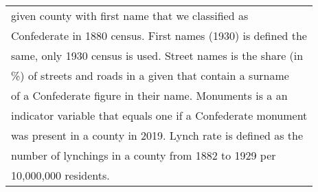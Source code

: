 \begin{table}
\begin{tabular}[t]{lccc}
\multicolumn{4}{l}{given county with first name that we classified as}\\
\multicolumn{4}{l}{Confederate in 1880 census. First names (1930) is defined the}\\
\multicolumn{4}{l}{same, only 1930 census is used. Street names is the share (in}\\
\multicolumn{4}{l}{\%) of streets and roads in a given that contain a surname}\\
\multicolumn{4}{l}{of a Confederate figure in their name. Monuments is a an}\\
\multicolumn{4}{l}{indicator variable that equals one if a Confederate monument}\\
\multicolumn{4}{l}{was present in a county in 2019. Lynch rate is defined as the}\\
\multicolumn{4}{l}{number of lynchings in a county from 1882 to 1929 per}\\
\multicolumn{4}{l}{10,000,000 residents.}\\
\end{tabular}
\end{table}
